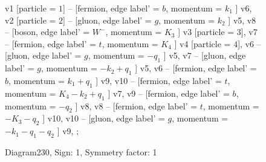 \documentclass{revtex4}
\begin{document}
\begin{figure}[!htb]
\begin{center}
{    %
v1 [particle = \(1\)] -- [fermion, edge label' = \(b\), momentum = \(k_{1}\) ] v6, 
v2 [particle = \(2\)] -- [gluon, edge label' = \(g\), momentum = \(k_{2}\) ] v5, 
v8 -- [boson, edge label' = \(W^{-}\), momentum = \(K_{3}\) ] v3 [particle = \(3\)], 
v7 -- [fermion, edge label' = \(t\), momentum = \(K_{4}\) ] v4 [particle = \(4\)], 
v6 -- [gluon, edge label' = \(g\), momentum = \(-q_{1}\) ] v5, 
v7 -- [gluon, edge label' = \(g\), momentum = \(-k_{2} + q_{1}\) ] v5, 
v6 -- [fermion, edge label' = \(b\), momentum = \(k_{1} + q_{1}\) ] v9, 
v10 -- [fermion, edge label' = \(t\), momentum = \(K_{4} - k_{2} + q_{1}\) ] v7, 
v9 -- [fermion, edge label' = \(b\), momentum = \(-q_{2}\) ] v8, 
v8 -- [fermion, edge label' = \(t\), momentum = \(-K_{3} - q_{2}\) ] v10, 
v10 -- [gluon, edge label' = \(g\), momentum = \(-k_{1} - q_{1} - q_{2}\) ] v9, 
};
\end{center}
\caption{Diagram230, Sign: 1, Symmetry factor: 1}
\end{figure}
\newpage
\end{document}
